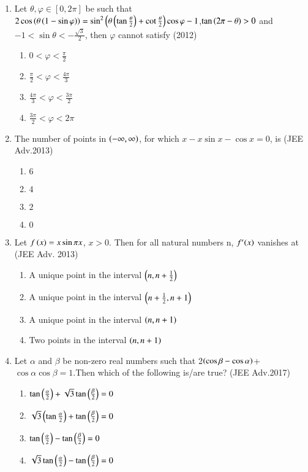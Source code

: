 \documentclass[journal,12pt,onecolumn]{IEEEtran}
\theoremstyle{remark}
\begin{document}
\begin{enumerate}
\item Let $\theta, \varphi \in [0,2\pi]$ be such that $2 \cos\left(\theta\left(1-\sin \varphi\right)\right)= 
\sin^2\left(\theta\left(\tan\frac{\theta}{2}\right)+\cot\frac{\theta}{2}\right)\cos \varphi-1$,$\tan\left(2\pi-\theta\right)>0$ and $-1<\sin{\theta}<-\frac{\sqrt{3}}{2}$, then $\varphi$ cannot satisfy \hfill(2012)
\begin{enumerate}
    \item $0<\varphi<\frac{\pi}{2}$
    \item $\frac{\pi}{2}<\varphi<\frac{4\pi}{3}$
    \item $\frac{4\pi}{3}<\varphi<\frac{3\pi}{2}$
    \item $\frac{3\pi}{2}<\varphi<2\pi$
\end{enumerate}
\item The number of points in $\left(-\infty, \infty\right)$, for which $x - x \sin x - \cos x = 0$, is \hfill(JEE Adv.2013)
\begin{enumerate}
    \item $6$
    \item $4$
    \item $2$
    \item $0$
\end{enumerate}
\item Let $f\left(x\right)=x\sin\pi x $, $ x>0 $. Then for all  natural numbers n, \( f'{\left(x\right)} \) vanishes at 
\hfill(JEE Adv. 2013)
\begin{enumerate}
    \item A unique point in the interval $\left(n,n+\frac{1}{2}\right)$
    \item A unique point in the interval $\left(n+\frac{1}{2},n+1\right)$
    \item A unique point in the interval $\left(n,n+1\right)$
    \item Two points in the interval $\left(n,n+1\right)$
\end{enumerate}
\item Let $\alpha$ and $\beta$ be non-zero real numbers such that 2$\left(\cos \beta - \cos \alpha\right)$+$\cos \alpha \cos \beta=1$.Then which of the following is/are true? \hfill(JEE Adv.2017)
\begin{enumerate}
    \item $\tan{\ensuremath{\left(\frac{\alpha}{2}\right)}+\sqrt{3}\tan\ensuremath{\left(\frac{\beta}{2}\right)}}=0$
    \item $\sqrt{3}\left(\tan{\frac{\alpha}{2}}\right)+\tan\left({\frac{\beta}{2}}\right)=0$
    \item $\tan{\ensuremath{\left(\frac{\alpha}{2}\right)}}-\tan{\ensuremath{\left(\frac{\beta}{2}\right)}}=0$
    \item $\sqrt{3}\tan{\ensuremath{\left(\frac{\alpha}{2}\right)}}-\tan{\ensuremath{\left(\frac{\beta}{2}\right)}}=0$
\end{enumerate}
\end{enumerate}
\end{document}
